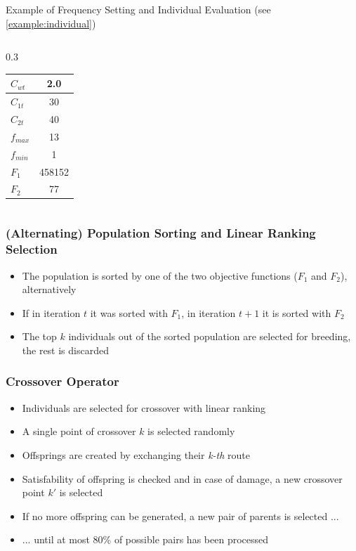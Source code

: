 \documentclass[dvipsnames]{beamer}
\begin{document}
\begin{frame}
\begin{exampleblock}{Example of Frequency Setting and Individual Evaluation (see \ref{example:individual})}
\begin{columns}
\begin{column}{0.3\textwidth}
\begin{tabular}{|l|c|}
          \hline
          \textbf{$C_{wt}$} & 2.0 \\
          \hline
          \textbf{$C_{1t}$} & 30 \\
          \hline
          \textbf{$C_{2t}$} & 40 \\
          \hline
          \textbf{$f_{max}$} & 13 \\
          \hline
          \textbf{$f_{min}$} & 1 \\
          \hline
          \textbf{$F_{1}$} & 458152 \\
          \hline
          \textbf{$F_{2}$} & 77 \\
          \hline
        \end{tabular}
      \end{column}
    \end{columns}
  \end{exampleblock}
\end{frame}

\begin{frame}
  \frametitle{(Alternating) Population Sorting and Linear Ranking Selection}
  \begin{itemize}
    \item The population is sorted by one of the two objective functions ($F_1$ and $F_2$), alternatively
    \item If in iteration $t$ it was sorted with $F_1$, in iteration $t+1$ it is sorted with $F_2$
    \item The top $k$ individuals out of the sorted population are selected for breeding, the rest is discarded
  \end{itemize}
\end{frame}

\begin{frame}
  \frametitle{Crossover Operator}
  \begin{itemize}
    \item Individuals are selected for crossover with linear ranking
    \item A single point of crossover $k$ is selected randomly
    \item Offsprings are created by exchanging their \textit{k-th} route
    \item Satisfability of offspring is checked and in case of damage, a new crossover point $k'$ is selected
    \item If no more offspring can be generated, a new pair of parents is selected ...
    \item ... until at most 80\% of possible pairs has been processed
  \end{itemize}
\end{frame}
\end{document}
